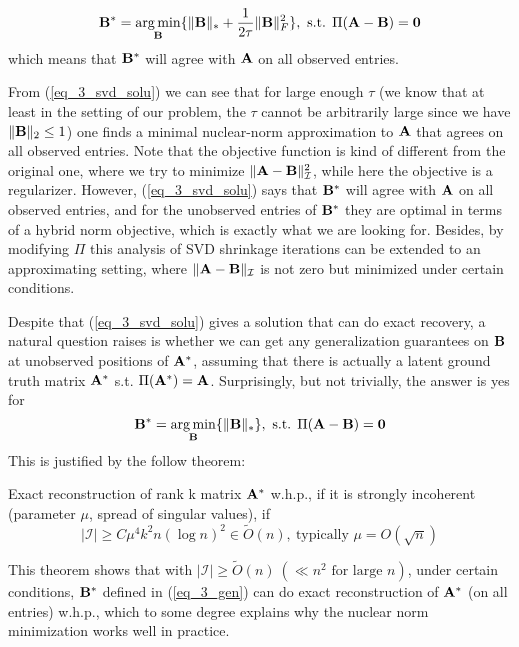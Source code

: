 \documentclass[../book-template.tex]{subfiles}
\begin{document}
\begin{equation}\label{eq_3_svd_solu}
	{\bf B}^* =\mathop{\arg\min}_{{\bf B}}\{\|{\bf B}\|_*+\frac{1}{2\tau}\|{\bf B}\|^2_F\},\ \text{s.t. }\Pi({\bf A}-{\bf B})=\bm{0}
\end{equation}
which means that ${\bf B}^*$ will agree with ${\bf A}$ on all observed entries. 
\par From (\ref{eq_3_svd_solu}) we can see that for large enough $\tau$ (we know that at least in the setting of our problem, the $\tau$ cannot be arbitrarily large since we have $\|{\bf B}\|_2\leq 1$) one finds a minimal nuclear-norm approximation to ${\bf A}$ that agrees on all observed entries. Note that the objective function is kind of different from the original one, where we try to minimize $\|{\bf A}-{\bf B}\|_{\mathcal{I}}^2$, while here the objective is a regularizer. However, (\ref{eq_3_svd_solu}) says that ${\bf B}^*$ will agree with ${\bf A}$ on all observed entries, and for the unobserved entries of ${\bf B}^*$ they are optimal in terms of a hybrid norm objective, which is exactly what we are looking for. Besides, by modifying $\Pi$ this analysis of SVD shrinkage iterations can be extended to an approximating setting, where $\|{\bf A}-{\bf B}\|_{\mathcal{I}}$ is not zero but minimized under certain conditions.
\par Despite that (\ref{eq_3_svd_solu}) gives a solution that can do exact recovery, a natural question raises is whether we can get any generalization guarantees on ${\bf B}$ at unobserved positions of ${\bf A^*}$, assuming that there is actually a latent ground truth matrix ${\bf A}^*$ s.t. $\Pi({\bf A}^*)={\bf A}$. Surprisingly, but not trivially, the answer is yes for
\begin{equation}\label{eq_3_gen}
	{\bf B}^*=\mathop{\arg \min}_{{\bf B}} \{\|{\bf B}\|_*\},\ \text{s.t. } \Pi({\bf A}-{\bf B})=\bm{0}
\end{equation}
This is justified by the follow theorem:
\begin{theorem}\label{thm_3_gen_guarantee}
	Exact reconstruction of rank k matrix ${\bf A}^*$ w.h.p., if it is strongly incoherent (parameter $\mu$, spread of singular values), if
	\begin{equation*}
		|\mathcal{I}|\geq C\mu^4k^2n(\log n)^2\in \tilde{{O}}(n),\ \text{typically }\mu=O(\sqrt{n})
	\end{equation*}
\end{theorem}
This theorem shows that with $|\mathcal{I}|\geq \tilde{{O}}(n)\ (\ll n^2 \text{ for large } n)$, under certain conditions, ${\bf B}^*$ defined in (\ref{eq_3_gen}) can do exact reconstruction of ${\bf A}^*$ (on all entries) w.h.p., which to some degree explains why the nuclear norm minimization works well in practice.  
\end{document}
